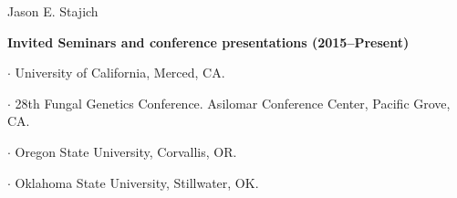 \documentclass[10pt]{article}
\begin{document}
\begin{cv}{\centerline{Jason E. Stajich}}
\begin{cvlistcompact}{\bf Invited Seminars and conference presentations (2015--Present)}
  \item $\cdot$  University of California, Merced, CA.
  \item $\cdot$  28th Fungal Genetics Conference. Asilomar Conference
    Center,  Pacific Grove, CA.
  \item $\cdot$ Oregon State University, Corvallis, OR. %
  \item $\cdot$  Oklahoma State University, Stillwater, OK. \\



\end{cvlistcompact}
\end{cv}
\end{document}

